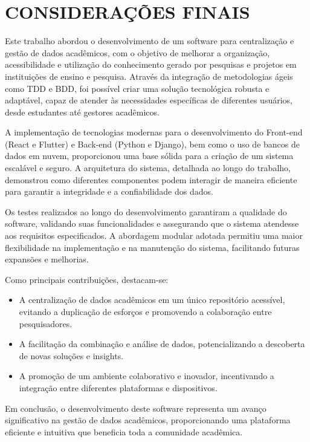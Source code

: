\chapter{CONSIDERAÇÕES FINAIS}


Este trabalho abordou o desenvolvimento de um software para centralização e gestão de dados acadêmicos, com o objetivo de melhorar a organização, acessibilidade e utilização do conhecimento gerado por pesquisas e projetos em instituições de ensino e pesquisa. Através da integração de metodologias ágeis como TDD e BDD, foi possível criar uma solução tecnológica robusta e adaptável, capaz de atender às necessidades específicas de diferentes usuários, desde estudantes até gestores acadêmicos.

A implementação de tecnologias modernas para o desenvolvimento do Front-end (React e Flutter) e Back-end (Python e Django), bem como o uso de bancos de dados em nuvem, proporcionou uma base sólida para a criação de um sistema escalável e seguro. A arquitetura do sistema, detalhada ao longo do trabalho, demonstrou como diferentes componentes podem interagir de maneira eficiente para garantir a integridade e a confiabilidade dos dados.

Os testes realizados ao longo do desenvolvimento garantiram a qualidade do software, validando suas funcionalidades e assegurando que o sistema atendesse aos requisitos especificados. A abordagem modular adotada permitiu uma maior flexibilidade na implementação e na manutenção do sistema, facilitando futuras expansões e melhorias.

Como principais contribuições, destacam-se:
\begin{itemize}
    \item A centralização de dados acadêmicos em um único repositório acessível, evitando a duplicação de esforços e promovendo a colaboração entre pesquisadores.
    \item A facilitação da combinação e análise de dados, potencializando a descoberta de novas soluções e insights.
    \item A promoção de um ambiente colaborativo e inovador, incentivando a integração entre diferentes plataformas e dispositivos.
\end{itemize}

Em conclusão, o desenvolvimento deste software representa um avanço significativo na gestão de dados acadêmicos, proporcionando uma plataforma eficiente e intuitiva que beneficia toda a comunidade acadêmica.



    

    